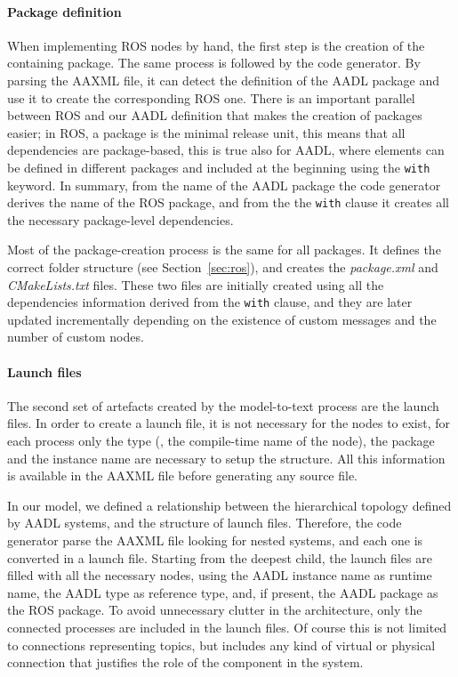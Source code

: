 \paragraph{Package definition} When implementing ROS nodes by hand, the first step is the creation of the containing package. The same process is followed by the code generator. By parsing the AAXML file, it can detect the definition of the AADL package and use it to create the corresponding ROS one. There is an important parallel between ROS and our AADL definition that makes the creation of packages easier; in ROS, a package is the minimal release unit, this means that all dependencies are package-based, this is true also for AADL, where elements can be defined in different packages and included at the beginning using the \texttt{with} keyword. In summary, from the name of the AADL package the code generator derives the name of the ROS package, and from the the \texttt{with} clause it creates all the necessary package-level dependencies.

Most of the package-creation process is the same for all packages. It defines the correct folder structure (see Section~\ref{sec:ros}), and creates the \textit{package.xml} and \textit{CMakeLists.txt} files. These two files are initially created using all the dependencies information derived from the \texttt{with} clause, and they are later updated incrementally depending on the existence of custom messages and the number of custom nodes.

\paragraph{Launch files} The second set of artefacts created by the model-to-text process are the launch files. In order to create a launch file, it is not necessary for the nodes to exist, for each process only the type (\ie, the compile-time name of the node), the package and the instance name are necessary to setup the structure. All this information is available in the AAXML file before generating any source file.

In our model, we defined a relationship between the hierarchical topology defined by AADL systems, and the structure of launch files. Therefore, the code generator parse the AAXML file looking for nested systems, and each one is converted in a launch file. Starting from the deepest child, the launch files are filled with all the necessary nodes, using the AADL instance name as runtime name, the AADL type as reference type, and, if present, the AADL package as the ROS package. To avoid unnecessary clutter in the architecture, only the connected processes are included in the launch files. Of course this is not limited to connections representing topics, but includes any kind of virtual or physical connection that justifies the role of the component in the system.

